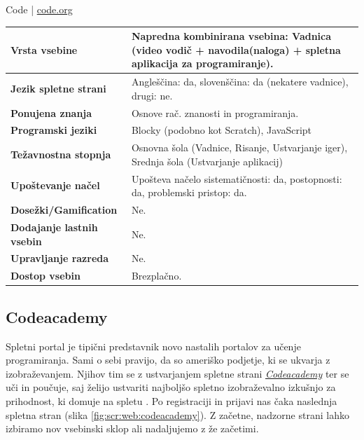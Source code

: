 \begin{osebnabox}[label={osebna:code.org}]{Code | \url{code.org}}
    \begin{tabular}{
  p{} |
  p{}  }
  \textbf{Vrsta vsebine} & Napredna kombinirana vsebina: Vadnica
                           (video vodič + navodila(naloga) + spletna
                           aplikacija za programiranje). \\
      \hline 
  \textbf{Jezik spletne strani} &  Angleščina: da, slovenščina: da
                                  (nekatere vadnice),
                                  drugi: ne. \\
      \hline
  \textbf{Ponujena znanja} & Osnove rač. znanosti in programiranja. \\
      \hline
  \textbf{Programski jeziki} & Blocky (podobno kot Scratch),
                               JavaScript \\
      \hline
  \textbf{Težavnostna stopnja} & Osnovna šola (Vadnice, Risanje,
                                 Ustvarjanje iger), Srednja šola
                                 (Ustvarjanje aplikacij) \\
      \hline
  \textbf{Upoštevanje načel} & Upošteva načelo sistematičnosti: da,
      postopnosti: da, problemski pristop: da. \\
      \hline
  \textbf{Dosežki/Gamification} & Ne. \\
      \hline
  \textbf{Dodajanje lastnih vsebin} & Ne. \\
      \hline
  \textbf{Upravljanje razreda} & Ne. \\
      \hline
  \textbf{Dostop vsebin} & Brezplačno. \\
\end{tabular}
\end{osebnabox}
\subsection{Codeacademy}

Spletni portal je tipični predstavnik novo nastalih portalov za učenje
programiranja. Sami o sebi pravijo, da so ameriško podjetje, ki se
ukvarja z izobraževanjem. Njihov tim se z ustvarjanjem spletne strani
\emph{\href{https://www.codecademy.com/}{Codeacademy}} ter se uči in
poučuje, saj želijo ustvariti najboljšo spletno izobraževalno izkušnjo
za prihodnost, ki domuje na spletu \cite{web:codeacademy}. Po
registraciji in prijavi nas čaka naslednja spletna stran (slika
\ref{fig:scr:web:codeacademy}). Z začetne, nadzorne strani lahko
izbiramo nov vsebinski sklop ali nadaljujemo z že začetimi.

